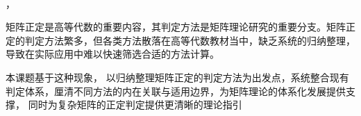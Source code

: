 \begin{center}
{\bf{}}\\[3pt]

\vspace{0.3cm}
{\kaishu\minzi}

{\university\school，\city}
\end{center}
{\fangsong
{}
矩阵正定是高等代数的重要内容，其判定方法是矩阵理论研究的重要分支。矩阵正定的判定方法繁多，但各类方法散落在高等代数教材当中，缺乏系统的归纳整理，导致在实际应用中难以快速筛选合适的方法计算。

本课题基于这种现象， 以归纳整理矩阵正定的判定方法为出发点，系统整合现有判定体系，厘清不同方法的内在关联与适用边界，为矩阵理论的体系化发展提供支撑， 同时为复杂矩阵的正定判定提供更清晰的理论指引

}\vspace{0.1cm}





